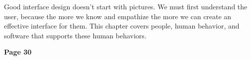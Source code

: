 
Good interface design doesn't start with pictures. We must first understand the user, because the more we know and empathize the more we can create an effective interface for them. This chapter covers people, human behavior, and software that supports these human behaviors.

\textbf{Page 30}